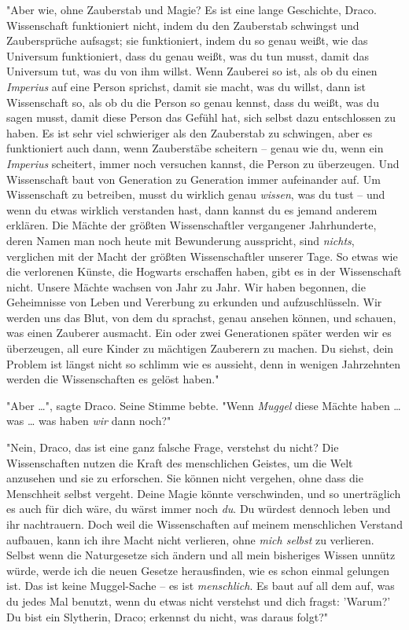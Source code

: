 {"Aber wie, ohne Zauberstab und Magie? Es ist eine lange Geschichte, Draco. Wissenschaft funktioniert nicht, indem du den Zauberstab schwingst und Zaubersprüche aufsagst; sie funktioniert, indem du so genau weißt, wie das Universum funktioniert, dass du genau weißt, was du tun musst, damit das Universum tut, was du von ihm willst. Wenn Zauberei so ist, als ob du einen \emph{Imperius} auf eine Person sprichst, damit sie macht, was du willst, dann ist Wissenschaft so, als ob du die Person so genau kennst, dass du weißt, was du sagen musst, damit diese Person das Gefühl hat, sich selbst dazu entschlossen zu haben. Es ist sehr viel schwieriger als den Zauberstab zu schwingen, aber es funktioniert auch dann, wenn Zauberstäbe scheitern -- genau wie du, wenn ein \emph{Imperius} scheitert, immer noch versuchen kannst, die Person zu überzeugen. Und Wissenschaft baut von Generation zu Generation immer aufeinander auf. Um Wissenschaft zu betreiben, musst du wirklich genau \emph{wissen}, was du tust -- und wenn du etwas wirklich verstanden hast, dann kannst du es jemand anderem erklären. Die Mächte der größten Wissenschaftler vergangener Jahrhunderte, deren Namen man noch heute mit Bewunderung ausspricht, sind \emph{nichts}, verglichen mit der Macht der größten Wissenschaftler unserer Tage. So etwas wie die verlorenen Künste, die Hogwarts erschaffen haben, gibt es in der Wissenschaft nicht. Unsere Mächte wachsen von Jahr zu Jahr. Wir haben begonnen, die Geheimnisse von Leben und Vererbung zu erkunden und aufzuschlüsseln. Wir werden uns das Blut, von dem du sprachst, genau ansehen können, und schauen, was einen Zauberer ausmacht. Ein oder zwei Generationen später werden wir es überzeugen, all eure Kinder zu mächtigen Zauberern zu machen. Du siehst, dein Problem ist längst nicht so schlimm wie es aussieht, denn in wenigen Jahrzehnten werden die Wissenschaften es gelöst haben."

"Aber …", sagte Draco. Seine Stimme bebte. "Wenn \emph{Muggel} diese Mächte haben … was … was haben \emph{wir} dann noch?"

"Nein, Draco, das ist eine ganz falsche Frage, verstehst du nicht? Die Wissenschaften nutzen die Kraft des menschlichen Geistes, um die Welt anzusehen und sie zu erforschen. Sie können nicht vergehen, ohne dass die Menschheit selbst vergeht. Deine Magie könnte verschwinden, und so unerträglich es auch für dich wäre, du wärst immer noch \emph{du}. Du würdest dennoch leben und ihr nachtrauern. Doch weil die Wissenschaften auf meinem menschlichen Verstand aufbauen, kann ich ihre Macht nicht verlieren, ohne \emph{mich selbst} zu verlieren. Selbst wenn die Naturgesetze sich ändern und all mein bisheriges Wissen unnütz würde, werde ich die neuen Gesetze herausfinden, wie es schon einmal gelungen ist. Das ist keine Muggel-Sache -- es ist \emph{menschlich}. Es baut auf all dem auf, was du jedes Mal benutzt, wenn du etwas nicht verstehst und dich fragst: 'Warum?' Du bist ein Slytherin, Draco; erkennst du nicht, was daraus folgt?"

}
